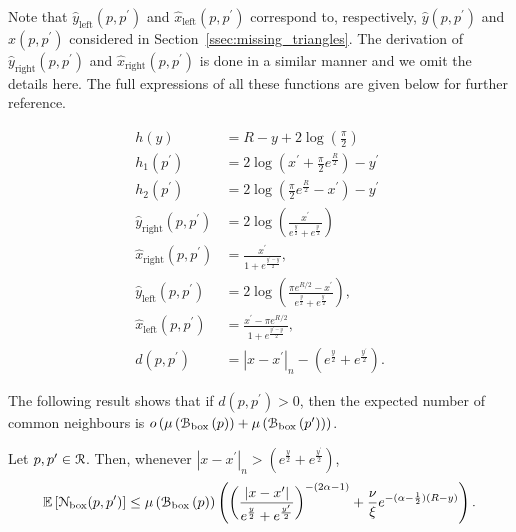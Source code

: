 Note that $\hat{y}_{\text{left}}(p,p^\prime)$ and $\hat{x}_{\text{left}}(p,p^\prime)$ correspond to, respectively, $\hat{y}(p,p^\prime)$ and $\hat{x}(p,p^\prime)$ considered in Section~\ref{ssec:missing_triangles}. The derivation of $\hat{y}_{\text{right}}(p,p^\prime)$ and $\hat{x}_{\text{right}}(p,p^\prime)$ is done in a similar manner and we omit the details here. The full expressions of all these functions are given below for further reference.

\begin{align}
	h(y) &= R - y + 2\log\left(\frac{\pi}{2}\right) \label{eq:def_height_y_P_n}\\
	h_1(p^\prime) &= 2\log\left(x^\prime + \frac{\pi}{2}e^{\frac{R}{2}}\right) - y^\prime \label{eq:def_height_left_P_n} \\
	h_2(p^\prime) &= 2\log\left(\frac{\pi}{2}e^{\frac{R}{2}} - x^\prime\right) - y^\prime 
		\label{eq:def_height_right_P_n} \\
	\hat{y}_{\text{right}}(p,p^\prime) &= 2\log\left(\frac{x^\prime}{e^{\frac{y}{2}} + e^{\frac{y^\prime}{2}}}\right)\\
	\hat{x}_{\text{right}}(p,p^\prime) &= \frac{x^\prime}{1 + 	
		e^{\frac{y^\prime - y}{2}}},\\
	\hat{y}_{\text{left}}(p,p^\prime) &= 2 \log\left(\frac{\pi e^{R/2} - x^\prime}{e^{\frac{y}{2}} + e^{\frac{y^\prime}{2}}}\right),\\
	\hat{x}_{\text{left}}(p,p^\prime) &= \frac{x^\prime - \pi e^{R/2}}{1 + e^{\frac{y^\prime - y}{2}}}, \\
	d(p,p^\prime) &= |x - x^\prime|_n - \left(e^{\frac{y}{2}} + e^{\frac{y^\prime}{2}}\right).
	\label{eq:def_d_p_p_prime}
\end{align}

The following result shows that if $d(p,p^\prime) > 0$, then the expected number of common neighbours is $o\left(\mu\left({\mathcal B}_{\text{box}}\left(p\right)\right) + \mu\left({\mathcal B}_{\text{box}}\left(p^\prime\right)\right)\right)$.

\begin{lemma}\label{lem:common_neighbours_Pcal_n}
Let $p, p^\prime \in {\mathcal R}$. Then, whenever $|x - x^\prime|_n > \left(e^{\frac{y}{2}} + e^{\frac{y^\prime}{2}}\right)$,
\[
	\mathbb{E}\left[{\mathcal N}_{\text{box}}(p,p^\prime)\right] \le \mu\left({\mathcal B}_{\text{box}}\left(p\right)\right)
	\left(\left(\frac{|x - x^\prime|}{e^{\frac{y}{2}} + e^{\frac{y^\prime}{2}}}\right)^{-(2\alpha - 1)}  
	+ \frac{\nu}{\xi} e^{-(\alpha - \frac{1}{2})(R-y)}\right).
\]
\end{lemma}

